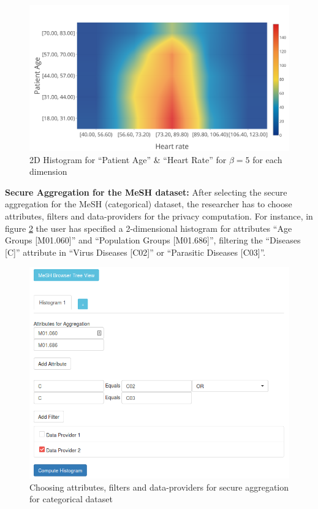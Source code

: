 \begin{figure}[H]
  \centering
  \includegraphics[width=0.8\columnwidth]{figures/cvi_histogram_results.png}
  \caption{2D Histogram for ``Patient Age'' \& ``Heart Rate'' for $\beta = 5$ for each dimension}
  \label{f:cvi-histogram-results}
\end{figure}


\textbf{Secure Aggregation for the MeSH dataset:} After selecting the secure aggregation for the MeSH (categorical) dataset, the researcher has to choose attributes, filters and data\hyp providers for the privacy computation.
For instance, in figure \ref{f:mesh-histogram} the user has specified a 2\hyp dimensional histogram for attributes ``Age Groups [M01.060]'' and ``Population Groups [M01.686]'', filtering the ``Diseases [C]'' attribute in ``Virus Diseases [C02]'' or ``Parasitic Diseases [C03]''.

\begin{figure}[H]
  \centering
  \includegraphics[width=0.7\columnwidth]{figures/mesh_histogram.png}
  \caption{Choosing attributes, filters and data\hyp providers for secure aggregation for categorical dataset}
  \label{f:mesh-histogram}
\end{figure}



